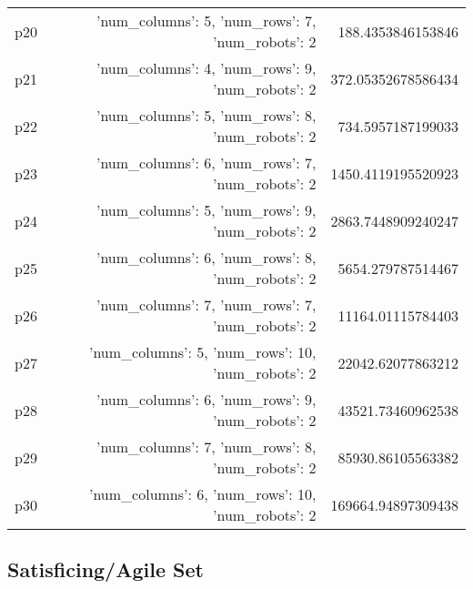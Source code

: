 \documentclass{article}
\begin{document}
\begin{center}
\begin{tabular}{r|r|r}
  p20&{'num\_columns': 5, 'num\_rows': 7, 'num\_robots': 2}&188.4353846153846\\
  p21&{'num\_columns': 4, 'num\_rows': 9, 'num\_robots': 2}&372.05352678586434\\
  p22&{'num\_columns': 5, 'num\_rows': 8, 'num\_robots': 2}&734.5957187199033\\
  p23&{'num\_columns': 6, 'num\_rows': 7, 'num\_robots': 2}&1450.4119195520923\\
  p24&{'num\_columns': 5, 'num\_rows': 9, 'num\_robots': 2}&2863.7448909240247\\
  p25&{'num\_columns': 6, 'num\_rows': 8, 'num\_robots': 2}&5654.279787514467\\
  p26&{'num\_columns': 7, 'num\_rows': 7, 'num\_robots': 2}&11164.01115784403\\
  p27&{'num\_columns': 5, 'num\_rows': 10, 'num\_robots': 2}&22042.62077863212\\
  p28&{'num\_columns': 6, 'num\_rows': 9, 'num\_robots': 2}&43521.73460962538\\
  p29&{'num\_columns': 7, 'num\_rows': 8, 'num\_robots': 2}&85930.86105563382\\
  p30&{'num\_columns': 6, 'num\_rows': 10, 'num\_robots': 2}&169664.94897309438
                            \end{tabular}
                            \end{center}
                    

                                \subsection*{Satisficing/Agile Set}
                                
\end{document}
